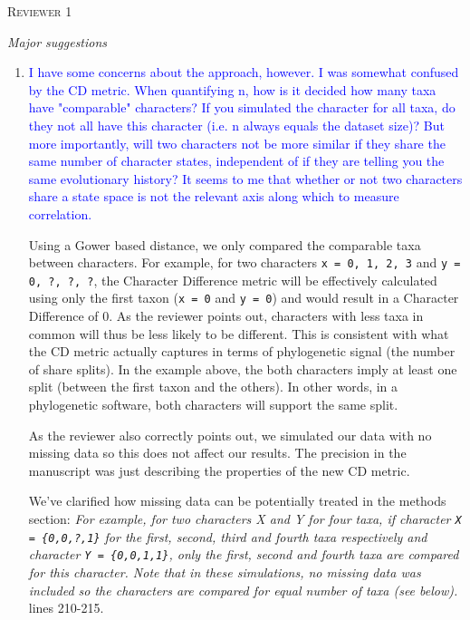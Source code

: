 \documentclass[12pt,letterpaper]{article}
\renewcommand{\section}[1]{%
\bigskip
\begin{center}
\begin{Large}
\normalfont\scshape #1
\medskip
\end{Large}
\end{center}}
\renewcommand{\subsection}[1]{%
\bigskip
\begin{center}
\begin{large}
\normalfont\itshape #1
\end{large}
\end{center}}
\begin{document}
%
%


\section{Reviewer 1}

\subsection{Major suggestions}

\begin{enumerate}

\item{\textcolor{blue}{I have some concerns about the approach, however. I was somewhat confused by the CD metric. When quantifying n, how is it decided how many taxa have "comparable" characters?
If you simulated the character for all taxa, do they not all have this character (i.e. n always equals the dataset size)?
But more importantly, will two characters not be more similar if they share the same number of character states, independent of if they are telling you the same evolutionary history?
It seems to me that whether or not two characters share a state space is not the relevant axis along which to measure correlation.}}
\label{gower}

Using a Gower based distance, we only compared the comparable taxa between characters.
For example, for two characters \texttt{x = {0, 1, 2, 3}} and \texttt{y = {0, ?, ?, ?}}, the Character Difference metric will be effectively calculated using only the first taxon (\texttt{x = {0}} and \texttt{y = {0}}) and would result in a Character Difference of 0.
As the reviewer points out, characters with less taxa in common will thus be less likely to be different.
This is consistent with what the CD metric actually captures in terms of phylogenetic signal (the number of share splits).
In the example above, the both characters imply at least one split (between the first taxon and the others).
In other words, in a phylogenetic software, both characters will support the same split.

As the reviewer also correctly points out, we simulated our data with no missing data so this does not affect our results.
The precision in the manuscript was just describing the properties of the new CD metric.

We've clarified how missing data can be potentially treated in the methods section:
\textit{For example, for two characters X and Y for four taxa, if character \texttt{X = \{0,0,?,1\}} for the first, second, third and fourth taxa respectively and character \texttt{Y = \{0,0,1,1\}}, only the first, second and fourth taxa are compared for this character.
Note that in these simulations, no missing data was included so the characters are compared for equal number of taxa (see below).} lines 210-215.


\end{enumerate}
\end{document}
